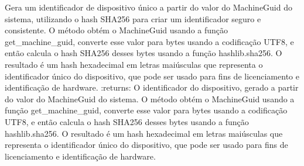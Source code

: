 \documentclass[letterpaper,10pt,english]{sphinxmanual}
\begin{document}
\begin{fulllineitems}
\label{\detokenize{api/online_license:online_license.device_id}}
\pysigstartsignatures
\pysiglinewithargsret
{}
{}
{}
\pysigstopsignatures
\sphinxAtStartPar
Gera um identificador de dispositivo único a partir do valor do MachineGuid do sistema, utilizando o hash SHA\sphinxhyphen{}256 para criar um identificador seguro e consistente. O método obtém o MachineGuid usando a função get\_machine\_guid, converte esse valor para bytes usando a codificação UTF\sphinxhyphen{}8, e então calcula o hash SHA\sphinxhyphen{}256 desses bytes usando a função hashlib.sha256. O resultado é um hash hexadecimal em letras maiúsculas que representa o identificador único do dispositivo, que pode ser usado para fins de licenciamento e identificação de hardware.
:returns: O identificador do dispositivo, gerado a partir do valor do MachineGuid do sistema. O método obtém o MachineGuid usando a função get\_machine\_guid, converte esse valor para bytes usando a codificação UTF\sphinxhyphen{}8, e então calcula o hash SHA\sphinxhyphen{}256 desses bytes usando a função hashlib.sha256. O resultado é um hash hexadecimal em letras maiúsculas que representa o identificador único do dispositivo, que pode ser usado para fins de licenciamento e identificação de hardware.
\begin{quote}\begin{description}
\sphinxAtStartPar
{}

\end{description}\end{quote}

\end{fulllineitems}

\end{document}
